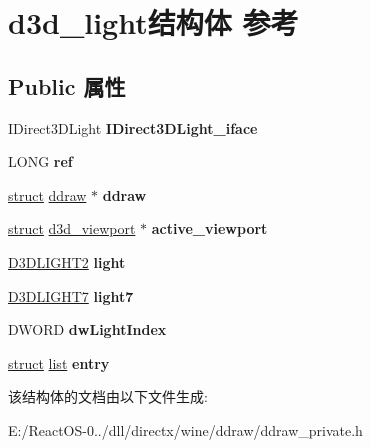 \hypertarget{structd3d__light}{}\section{d3d\+\_\+light结构体 参考}
\label{structd3d__light}
\subsection*{Public 属性}
\begin{DoxyCompactItemize}
\item 
\mbox{\label{structd3d__light_af7d43af1f5809a00a8964da806e151c6}} 
I\+Direct3\+D\+Light {\bfseries I\+Direct3\+D\+Light\+\_\+iface}
\item 
\mbox{\label{structd3d__light_a9bc8cb550cab7a6b44ca664d4144c68d}} 
L\+O\+NG {\bfseries ref}
\item 
\mbox{\label{structd3d__light_a59446295623998423e00bd8bf5c5e7b9}} 
\hyperlink{interfacestruct}{struct} \hyperlink{structddraw}{ddraw} $\ast$ {\bfseries ddraw}
\item 
\mbox{\label{structd3d__light_a27a971df6132cc4df509af978865810a}} 
\hyperlink{interfacestruct}{struct} \hyperlink{structd3d__viewport}{d3d\+\_\+viewport} $\ast$ {\bfseries active\+\_\+viewport}
\item 
\mbox{\label{structd3d__light_a0f5b2041f532474de55f9179d6d4705f}} 
\hyperlink{struct___d3_d_l_i_g_h_t2}{D3\+D\+L\+I\+G\+H\+T2} {\bfseries light}
\item 
\mbox{\label{structd3d__light_a968fa3e54444675937a94cbe1d203e81}} 
\hyperlink{struct___d3_d_l_i_g_h_t7}{D3\+D\+L\+I\+G\+H\+T7} {\bfseries light7}
\item 
\mbox{\label{structd3d__light_a7429dc0589c313455a9f17e19ef2033d}} 
D\+W\+O\+RD {\bfseries dw\+Light\+Index}
\item 
\mbox{\label{structd3d__light_a08e2c62c065d7ed150b092cf6ec79a1d}} 
\hyperlink{interfacestruct}{struct} \hyperlink{classlist}{list} {\bfseries entry}
\end{DoxyCompactItemize}


该结构体的文档由以下文件生成\+:\begin{DoxyCompactItemize}
\item 
E\+:/\+React\+O\+S-\/0../dll/directx/wine/ddraw/ddraw\+\_\+private.\+h\end{DoxyCompactItemize}
